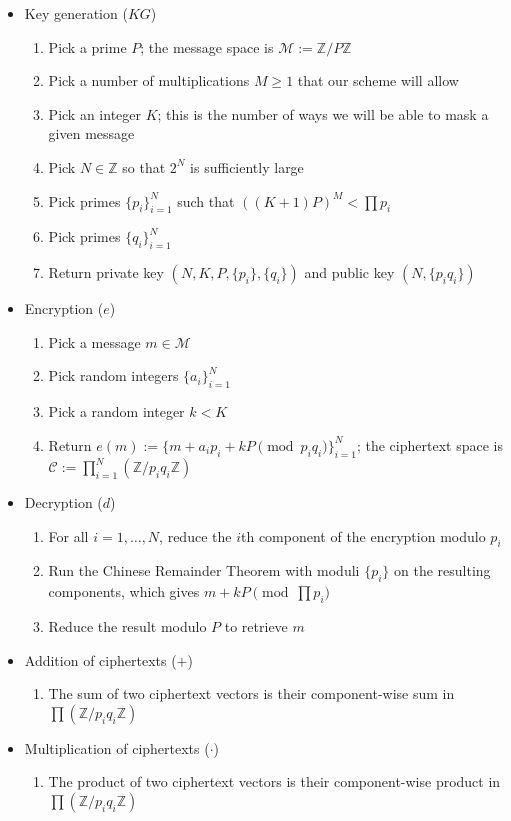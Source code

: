 \documentclass[11pt]{report}
\newcommand{\Z}{\mathbb{Z}}
\newcommand{\M}{\mathcal{M}}
\newcommand{\ZP}{\mathbb{Z}/P\mathbb{Z}}
\begin{document}
\begin{itemize}
\item Key generation ($KG$)
\begin{enumerate}
\item Pick a prime $P$; the message space is $\M := \ZP$
\item Pick a number of multiplications $M\geq 1$ that our scheme will allow
\item Pick an integer $K$; this is the number of ways we will be able to mask a given message
\item Pick $N\in \Z$ so that $2^N$ is sufficiently large
\item Pick primes $\{p_i\}_{i=1}^N$ such that $((K+1)P)^M<\prod p_i$
\item Pick primes $\{q_i\}_{i=1}^N$
\item Return private key $(N,K,P,\{p_i\},\{q_i\})$ and public key $(N,\{p_iq_i\})$
\end{enumerate}

\item Encryption ($e$)
\begin{enumerate}
\item Pick a message $m\in \M$
\item Pick random integers $\{a_i\}_{i=1}^N$
\item Pick a random integer $k<K$
\item Return $e(m):=\{m+a_ip_i+kP \pmod{p_iq_i}\}_{i=1}^N$; the ciphertext space is $\mathcal{C} := \prod_{i=1}^N(\Z/p_iq_i\Z)$
\end{enumerate}

\item Decryption ($d$)
\begin{enumerate}
\item For all $i=1,\ldots,N$, reduce the $i$th component of the encryption modulo $p_i$
\item Run the Chinese Remainder Theorem with moduli $\{p_i\}$ on the resulting components, which gives $m+kP \pmod{\prod p_i}$
\item Reduce the result modulo $P$ to retrieve $m$
\end{enumerate}

\item Addition of ciphertexts ($+$)
\begin{enumerate}
\item The sum of two ciphertext vectors is their component-wise sum in $\prod (\Z/p_iq_i\Z)$
\end{enumerate}

\item Multiplication of ciphertexts ($\cdot$)
\begin{enumerate}
\item The product of two ciphertext vectors is their component-wise product in $\prod(\Z/p_iq_i\Z)$
\end{enumerate}
\end{itemize}
\end{document}
